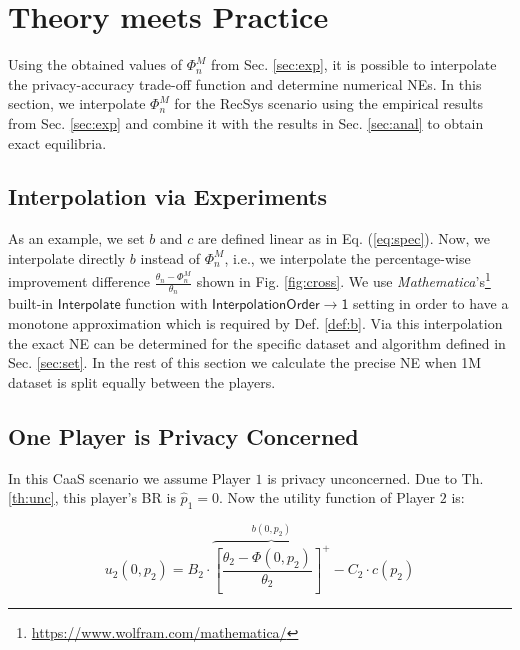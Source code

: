 \documentclass[USenglish,oneside,twocolumn]{article}
\theoremstyle{plain}
\begin{document}
	\vspace{-0.5cm}
    \section{Theory meets Practice}
    \label{sec:phi}
    \vspace{-0.25cm}
    
    Using the obtained values of $\Phi_n^M$ from Sec. \ref{sec:exp}, it is possible to interpolate the privacy-accuracy trade-off function and determine numerical NEs. In this section, we interpolate $\Phi_n^M$ for the RecSys scenario using the empirical results from Sec. \ref{sec:exp} and combine it with the results in Sec. \ref{sec:anal} to obtain exact equilibria.  
    
    \vspace{-0.5cm}
    \subsection{Interpolation via Experiments}
    \label{sec:inter}
    \vspace{-0.25cm}
    
    As an example, we set $b$ and $c$ are defined linear as in Eq. (\ref{eq:spec}). Now, we interpolate directly $b$ instead of $\Phi^M_n$, i.e., we interpolate the percentage-wise improvement difference $\frac{\theta_n-\Phi^M_n}{\theta_n}$ shown in Fig. \ref{fig:cross}. We use \textit{Mathematica}'s\footnote{\url{https://www.wolfram.com/mathematica/}} built-in $\mathsf{Interpolate}$ function with $\mathsf{InterpolationOrder\rightarrow1}$ setting in order to have a monotone approximation which is required by Def. \ref{def:b}. Via this interpolation the exact NE can be determined for the specific dataset and algorithm defined in Sec. \ref{sec:set}. In the rest of this section we calculate the precise NE when 1M dataset is split equally between the players.  
    
    \vspace{-0.5cm}
    \subsection{One Player is Privacy Concerned}
    \vspace{-0.25cm}
    
    In this CaaS scenario we assume Player $1$ is privacy unconcerned. Due to Th. \ref{th:unc}, this player's BR is $\hat{p}_1=0$. Now the utility function of Player $2$ is:
    
    \vspace{-0.25cm}
    \begin{equation}
    \label{eq:caas_ut}
    u_2(0,p_2)=B_2\cdot\overbrace{\left[\frac{\theta_2-\Phi(0,p_2)}{\theta_2}\right]^+}^{b(0,p_2)}-C_2\cdot c(p_2)
    \end{equation}
    
\end{document}

